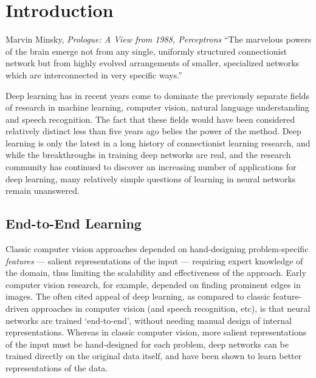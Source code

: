 \documentclass[thesis]{subfiles}
\begin{document}

\chapter{Introduction}  %

\begin{chapquote}{Marvin Minsky, \textit{Prologue: A View from 1988, Perceptrons}}
``The marvelous powers of the brain emerge not from any single, uniformly structured connectionist network but from highly evolved arrangements of smaller, specialized networks which are interconnected in very specific ways.''
\end{chapquote}

Deep learning has in recent years come to dominate the previously separate fields of research in machine learning, computer vision, natural language understanding and speech recognition. The fact that these fields would have been considered relatively distinct less than five years ago belies the power of the method. Deep learning is only the latest in a long history of connectionist learning research, and while the breakthroughs in training deep networks are real, and the research community has continued to discover an increasing number of applications for deep learning, many relatively simple questions of learning in neural networks remain unanswered.

\section{End-to-End Learning}
Classic computer vision approaches depended on hand-designing problem-specific \emph{features} --- salient representations of the input --- requiring expert knowledge of the domain, thus limiting the scalability and effectiveness of the approach. Early computer vision research, for example, depended on finding prominent edges in images. The often cited appeal of deep learning, as compared to classic feature-driven approaches in computer vision (and speech recognition, etc), is that neural networks are trained `end-to-end', \ie without needing manual design of internal representations. Whereas in classic computer vision, more salient representations of the input must be hand-designed for each problem, deep networks can be trained directly on the original data itself, and have been shown to learn better representations of the data.
\end{document}
